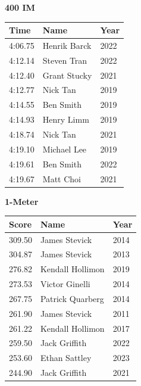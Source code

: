 \vspace{1.2em}
\noindent\begin{minipage}[t]{0.48\textwidth}
\centering
\textbf{\textcolor{teamprimary}{400 IM}}\par
\vspace{0.5em}
\centering
\small
\renewcommand{\arraystretch}{1.0}
\setlength{\tabcolsep}{4pt}
\begin{tabular}{@{}p{1.8cm}p{3.0cm}p{1.0cm}@{}}
\toprule
\textbf{Time} & \textbf{Name} & \textbf{Year} \\
\midrule
4:06.75 & Henrik Barck & 2022 \\
4:12.14 & Steven Tran & 2022 \\
4:12.40 & Grant Stucky & 2021 \\
4:12.77 & Nick Tan & 2019 \\
4:14.55 & Ben Smith & 2019 \\
4:14.93 & Henry Limm & 2019 \\
4:18.74 & Nick Tan & 2021 \\
4:19.10 & Michael Lee & 2019 \\
4:19.61 & Ben Smith & 2022 \\
4:19.67 & Matt Choi & 2021 \\
\bottomrule
\end{tabular}
\end{minipage}
\hfill
\begin{minipage}[t]{0.48\textwidth}
\centering
\textbf{\textcolor{teamprimary}{1-Meter}}\par
\vspace{0.5em}
\centering
\small
\renewcommand{\arraystretch}{1.0}
\setlength{\tabcolsep}{4pt}
\begin{tabular}{@{}p{1.8cm}p{3.0cm}p{1.0cm}@{}}
\toprule
\textbf{Score} & \textbf{Name} & \textbf{Year} \\
\midrule
309.50 & James Stevick & 2014 \\
304.87 & James Stevick & 2013 \\
276.82 & Kendall Hollimon & 2019 \\
273.53 & Victor Ginelli & 2014 \\
267.75 & Patrick Quarberg & 2014 \\
261.90 & James Stevick & 2011 \\
261.22 & Kendall Hollimon & 2017 \\
259.50 & Jack Griffith & 2022 \\
253.60 & Ethan Sattley & 2023 \\
244.90 & Jack Griffith & 2021 \\
\bottomrule
\end{tabular}
\end{minipage}

